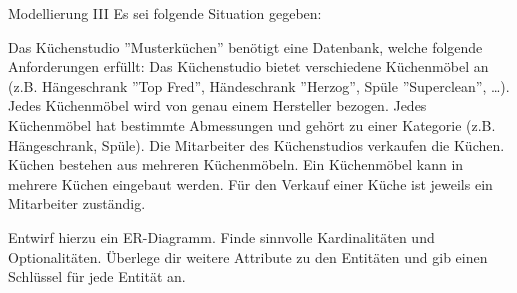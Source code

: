 \documentclass[12pt,a4paper,notitlepage,leqno]{article}
\begin{document}
\begin{aufgabe}{Modellierung III}
Es sei folgende Situation gegeben:\medskip

     {\sf Das Küchenstudio ''Musterküchen'' benötigt eine Datenbank, welche folgende Anforderungen erfüllt: Das Küchenstudio bietet verschiedene Küchenmöbel an (z.B. Hängeschrank ''Top Fred'', Händeschrank ''Herzog'', Spüle ''Superclean'', \dots). Jedes Küchenmöbel wird von genau einem Hersteller bezogen. Jedes Küchenmöbel hat bestimmte Abmessungen und gehört zu einer Kategorie (z.B. Hängeschrank, Spüle). Die Mitarbeiter des Küchenstudios verkaufen die Küchen. Küchen bestehen aus mehreren Küchenmöbeln. Ein Küchenmöbel kann in mehrere Küchen eingebaut werden. Für den Verkauf einer Küche ist jeweils ein Mitarbeiter zuständig.}\medskip

Entwirf hierzu ein ER-Diagramm. Finde sinnvolle Kardinalitäten und Optionalitäten. Überlege dir weitere Attribute zu den Entitäten und gib einen Schlüssel für jede Entität an.
\end{aufgabe}
\end{document}
